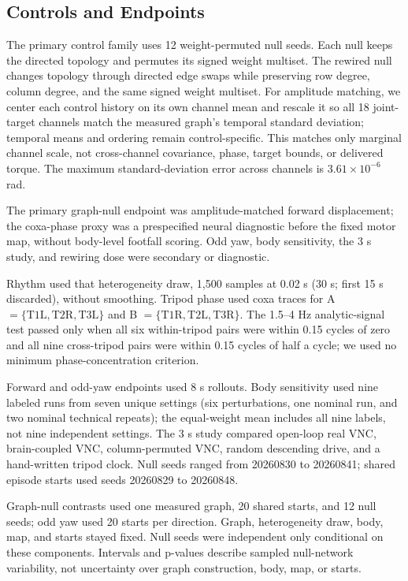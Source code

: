 \documentclass[10pt]{article}
\begin{document}
\subsection{Controls and Endpoints}
The primary control family uses 12 weight-permuted null seeds. Each null keeps the directed topology and permutes its signed weight multiset. The rewired null changes topology through directed edge swaps while preserving row degree, column degree, and the same signed weight multiset. For amplitude matching, we center each control history on its own channel mean and rescale it so all 18 joint-target channels match the measured graph's temporal standard deviation; temporal means and ordering remain control-specific. This matches only marginal channel scale, not cross-channel covariance, phase, target bounds, or delivered torque. The maximum standard-deviation error across channels is $3.61\times10^{-6}$ rad.

The primary graph-null endpoint was amplitude-matched forward displacement; the coxa-phase proxy was a prespecified neural diagnostic before the fixed motor map, without body-level footfall scoring. Odd yaw, body sensitivity, the 3 s study, and rewiring dose were secondary or diagnostic.

Rhythm used that heterogeneity draw, 1,500 samples at 0.02 s (30 s; first 15 s discarded), without smoothing. Tripod phase used coxa traces for A $=\{\mathrm{T1L,T2R,T3L}\}$ and B $=\{\mathrm{T1R,T2L,T3R}\}$. The 1.5--4 Hz analytic-signal test passed only when all six within-tripod pairs were within 0.15 cycles of zero and all nine cross-tripod pairs were within 0.15 cycles of half a cycle; we used no minimum phase-concentration criterion.

Forward and odd-yaw endpoints used 8 s rollouts. Body sensitivity used nine labeled runs from seven unique settings (six perturbations, one nominal run, and two nominal technical repeats); the equal-weight mean includes all nine labels, not nine independent settings. The 3 s study compared open-loop real VNC, brain-coupled VNC, column-permuted VNC, random descending drive, and a hand-written tripod clock. Null seeds ranged from 20260830 to 20260841; shared episode starts used seeds 20260829 to 20260848.

Graph-null contrasts used one measured graph, 20 shared starts, and 12 null seeds; odd yaw used 20 starts per direction. Graph, heterogeneity draw, body, map, and starts stayed fixed. Null seeds were independent only conditional on these components. Intervals and p-values describe sampled null-network variability, not uncertainty over graph construction, body, map, or starts.
\end{document}
